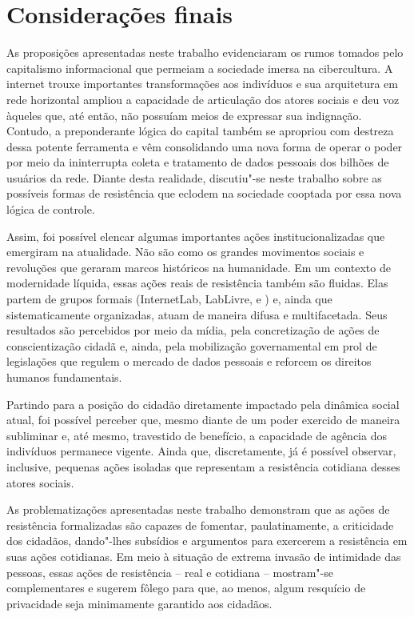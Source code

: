 \section{Considerações finais}

As proposições apresentadas neste trabalho evidenciaram os rumos tomados
pelo capitalismo informacional que permeiam a sociedade imersa na
cibercultura. A internet trouxe importantes transformações aos
indivíduos e sua arquitetura em rede horizontal ampliou a capacidade de
articulação dos atores sociais e deu voz àqueles que, até então, não
possuíam meios de expressar sua indignação. Contudo, a preponderante
lógica do capital também se apropriou com destreza dessa potente
ferramenta e vêm consolidando uma nova forma de operar o poder por meio
da ininterrupta coleta e tratamento de dados pessoais dos bilhões de
usuários da rede. Diante desta realidade, discutiu"-se neste trabalho
sobre as possíveis formas de resistência que eclodem na sociedade
cooptada por essa nova lógica de controle.

Assim, foi possível elencar algumas importantes ações
institucionalizadas que emergiram na atualidade. Não são como os grandes
movimentos sociais e revoluções que geraram marcos históricos na
humanidade. Em um contexto de modernidade líquida, essas ações reais de
resistência também são fluidas. Elas partem de grupos formais
(InternetLab, LabLivre,  e ) e, ainda que sistematicamente
organizadas, atuam de maneira difusa e multifacetada. Seus resultados
são percebidos por meio da mídia, pela concretização de ações de
conscientização cidadã e, ainda, pela mobilização governamental em prol
de legislações que regulem o mercado de dados pessoais e reforcem os
direitos humanos fundamentais.

Partindo para a posição do cidadão diretamente impactado pela dinâmica
social atual, foi possível perceber que, mesmo diante de um poder
exercido de maneira subliminar e, até mesmo, travestido de benefício, a
capacidade de agência dos indivíduos permanece vigente. Ainda que,
discretamente, já é possível observar, inclusive, pequenas ações
isoladas que representam a resistência cotidiana desses atores sociais.

As problematizações apresentadas neste trabalho demonstram que as ações
de resistência formalizadas são capazes de fomentar, paulatinamente, a
criticidade dos cidadãos, dando"-lhes subsídios e argumentos para
exercerem a resistência em suas ações cotidianas. Em meio à situação de
extrema invasão de intimidade das pessoas, essas ações de resistência --
real e cotidiana -- mostram"-se complementares e sugerem fôlego para que,
ao menos, algum resquício de privacidade seja minimamente garantido aos
cidadãos.

